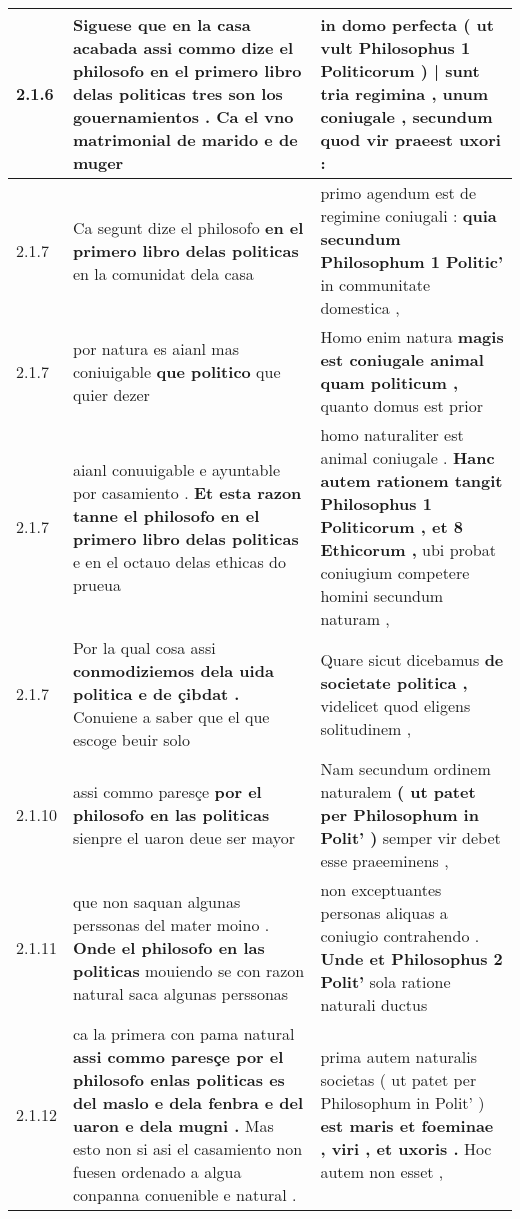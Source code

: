 \begin{tabular}{|p{1cm}|p{6.5cm}|p{6.5cm}|}
2.1.6 & Siguese que en la casa acabada \textbf{ assi commo dize el philosofo en el primero libro delas politicas tres son los gouernamientos . } Ca el vno matrimonial de marido e de muger & in domo perfecta \textbf{ ( ut vult Philosophus 1 Politicorum ) | sunt tria regimina , unum coniugale , } secundum quod vir praeest uxori : \\\hline
2.1.7 & Ca segunt dize el philosofo \textbf{ en el primero libro delas politicas } en la comunidat dela casa & primo agendum est de regimine coniugali : \textbf{ quia secundum Philosophum 1 Politic’ } in communitate domestica , \\\hline
2.1.7 & por natura es aianl mas coniuigable \textbf{ que politico } que quier dezer & Homo enim natura \textbf{ magis est coniugale animal quam politicum , } quanto domus est prior \\\hline
2.1.7 & aianl conuuigable e ayuntable por casamiento . \textbf{ Et esta razon tanne el philosofo en el primero libro delas politicas } e en el octauo delas ethicas do prueua & homo naturaliter est animal coniugale . \textbf{ Hanc autem rationem tangit Philosophus 1 Politicorum , et 8 Ethicorum , } ubi probat coniugium competere homini secundum naturam , \\\hline
2.1.7 & Por la qual cosa assi \textbf{ conmodiziemos dela uida politica e de çibdat . } Conuiene a saber que el que escoge beuir solo & Quare sicut dicebamus \textbf{ de societate politica , } videlicet quod eligens solitudinem , \\\hline
2.1.10 & assi commo paresçe \textbf{ por el philosofo en las politicas } sienpre el uaron deue ser mayor & Nam secundum ordinem naturalem \textbf{ ( ut patet per Philosophum in Polit’ ) } semper vir debet esse praeeminens , \\\hline
2.1.11 & que non saquan algunas perssonas del mater moino . \textbf{ Onde el philosofo en las politicas } mouiendo se con razon natural saca algunas perssonas & non exceptuantes personas aliquas a coniugio contrahendo . \textbf{ Unde et Philosophus 2 Polit’ } sola ratione naturali ductus \\\hline
2.1.12 & ca la primera con pama natural \textbf{ assi commo paresçe por el philosofo enlas politicas es del maslo e dela fenbra e del uaron e dela mugni . } Mas esto non si asi el casamiento non fuesen ordenado a algua conpanna conuenible e natural . & prima autem naturalis societas ( ut patet per Philosophum in Polit’ ) \textbf{ est maris et foeminae , viri , et uxoris . } Hoc autem non esset , \\\hline

\end{tabular}
